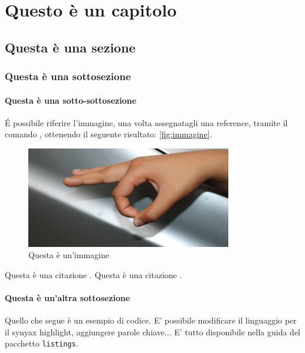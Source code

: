 \chapter{Questo è un capitolo}

\lipsum[1]

\section{Questa è una sezione}

\lipsum[2]

\subsection{Questa è una sottosezione}

\lipsum[3]

\subsubsection{Questa è una sotto-sottosezione}

\lipsum[4]

É possibile riferire l'immagine, una volta assegnatagli una reference, tramite il comando , ottenendo il seguente risultato: \autoref{fig:immagine}.

\begin{figure}
    \label{fig:immagine}
    \centering
    \includegraphics[width= 0.8\textwidth]{images/Capitolo1/immagine.jpg} 
    \caption{Questa è un'immagine} 
\end{figure}

Questa è una citazione \cite{PerLaCitazione}.
Questa è una citazione \cite{Prova2}.

\subsubsection{Questa è un'altra sottosezione}

Quello che segue è un esempio di codice. E' possibile modificare il linguaggio per il synyax highlight, aggiungere parole chiave... E' tutto disponibile nella guida del pacchetto \texttt{listings}.

